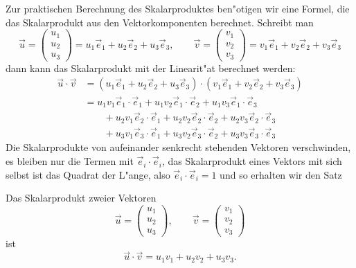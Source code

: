 Zur praktischen Berechnung des Skalarproduktes ben"otigen wir
eine Formel, die das Skalarprodukt aus den Vektorkomponenten
berechnet.
Schreibt man
\[
\vec u=\begin{pmatrix}u_1\\u_2\\u_3\end{pmatrix}
=u_1\vec e_1+u_2\vec e_2+u_3\vec e_3
,
\qquad
\vec v=\begin{pmatrix}v_1\\v_2\\v_3\end{pmatrix}
=v_1\vec e_1+v_2\vec e_2+v_3\vec e_3
\]
dann kann das Skalarprodukt mit der Linearit"at berechnet werden:
\begin{align*}
\vec u\cdot\vec v
&=
(u_1\vec e_1+u_2\vec e_2+u_3\vec e_3)\cdot
(v_1\vec e_1+v_2\vec e_2+v_3\vec e_3)
\\
&=
u_1v_1\vec e_1\cdot\vec e_1+
u_1v_2\vec e_1\cdot\vec e_2+
u_1v_3\vec e_1\cdot\vec e_3\\
&\qquad +
u_2v_1\vec e_2\cdot\vec e_1+
u_2v_2\vec e_2\cdot\vec e_2+
u_2v_3\vec e_2\cdot\vec e_3\\
&\qquad+
u_3v_1\vec e_3\cdot\vec e_1+
u_3v_2\vec e_3\cdot\vec e_2+
u_3v_3\vec e_3\cdot\vec e_3
\end{align*}
Die Skalarprodukte von aufeinander senkrecht stehenden Vektoren
verschwinden, es bleiben nur die Termen mit $\vec e_i\cdot\vec e_i$,
das Skalarprodukt eines Vektors mit sich selbst ist das Quadrat
der L"ange, also $\vec e_i\cdot \vec e_i=1$ und so erhalten wir den
Satz
\begin{satz}
Das Skalarprodukt zweier Vektoren
\[
\vec u=\begin{pmatrix}u_1\\u_2\\u_3\end{pmatrix},
\qquad
\vec v=\begin{pmatrix}v_1\\v_2\\v_3\end{pmatrix}
\]
ist
\[
\vec u\cdot\vec v
=
u_1v_1+u_2v_2+u_3v_3.
\]
\end{satz}

